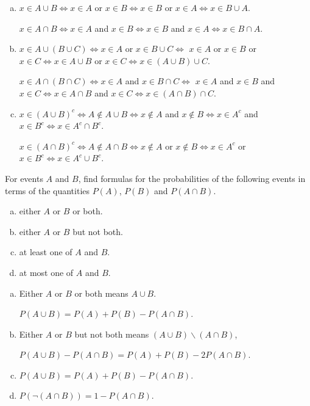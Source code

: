 \documentclass[12pt]{elegantbook}
\begin{document}
    \begin{solution}
        \begin{enumerate}[(a)]
            \item $x\in A\cup B\Leftrightarrow x\in A$ or $x\in B\Leftrightarrow x\in B$ or $x\in A\Leftrightarrow x\in B\cup A$. 
            
            $x\in A\cap B\Leftrightarrow x\in A$ and $x\in B\Leftrightarrow x\in B$ and $x\in A\Leftrightarrow x\in B\cap A$. 
            \item $x\in A\cup (B\cup C)\Leftrightarrow x\in A$ or $x\in B\cup C\Leftrightarrow$ $x\in A$ or $x\in B$ or $x\in C\Leftrightarrow x\in A\cup B$ or $x\in C \Leftrightarrow x\in (A\cup B)\cup C$. 
            
            $x\in A\cap (B\cap C)\Leftrightarrow x\in A$ and $x\in B\cap C\Leftrightarrow$ $x\in A$ and $x\in B$ and $x\in C\Leftrightarrow x\in A\cap B$ and $x\in C \Leftrightarrow x\in (A\cap B)\cap C$. 
            \item $x\in (A\cup B)^c\Leftrightarrow A\notin A\cup B \Leftrightarrow x\notin A$ and $x\notin B\Leftrightarrow x\in A^c$ and $x\in B^c\Leftrightarrow x\in A^c\cap B^c$. 
            
            $x\in (A\cap B)^c\Leftrightarrow A\notin A\cap B \Leftrightarrow x\notin A$ or $x\notin B\Leftrightarrow x\in A^c$ or $x\in B^c\Leftrightarrow x\in A^c\cup B^c$. 
        \end{enumerate}
    \end{solution}

    \begin{exercise}
        For events $A$ and $B$, find formulas for the probabilities of the following events in terms of the quantities $P(A)$, $P(B)$ and $P(A\cap B)$. 
        \begin{enumerate}[(a)]
            \item either $A$ or $B$ or both. 
            \item either $A$ or $B$ but not both. 
            \item at least one of $A$ and $B$.
            \item at most one of $A$ and $B$.
        \end{enumerate}
    \end{exercise}

    \begin{solution}
        \begin{enumerate}[(a)]
            \item Either $A$ or $B$ or both means $A\cup B$. 
            
            $P(A\cup B)=P(A)+P(B)-P(A\cap B)$. 
            \item Either $A$ or $B$ but not both means $(A\cup B)\backslash(A\cap B)$, 
            
            $P(A\cup B)-P(A\cap B)=P(A)+P(B)-2P(A\cap B)$. 
            \item $P(A\cup B)=P(A)+P(B)-P(A\cap B)$. 
            \item $P(\neg (A\cap B))=1-P(A\cap B)$. 
        \end{enumerate}
    \end{solution}
\end{document}
